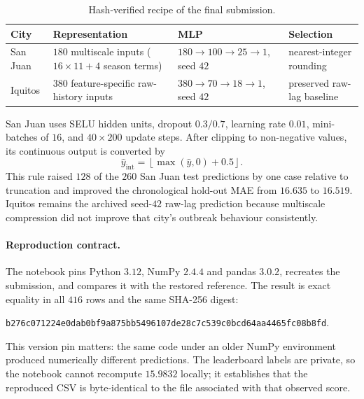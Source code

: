 \documentclass[11pt,a4paper]{article}
\newcommand{\submissionhash}{\texttt{b276c071224e0dab0bf9a875bb5496107}\allowbreak\texttt{de28c7c539c0bcd64aa4465fc08b8fd}}
\begin{document}
\begin{table}[H]
\centering
\caption{Hash-verified recipe of the final submission.}
\label{tab:finalrecipe}
\small
\begin{tabular}{>{\raggedright\arraybackslash}p{2.0cm}>{\raggedright\arraybackslash}p{4.2cm}>{\raggedright\arraybackslash}p{3.4cm}>{\raggedright\arraybackslash}p{3.0cm}}
\toprule
\textbf{City} & \textbf{Representation} & \textbf{MLP} & \textbf{Selection}\\
\midrule
San Juan & $180$ multiscale inputs ($16\times11+4$ season terms) & $180\rightarrow100\rightarrow25\rightarrow1$, seed $42$ & nearest-integer rounding\\
Iquitos & $380$ feature-specific raw-history inputs & $380\rightarrow70\rightarrow18\rightarrow1$, seed $42$ & preserved raw-lag baseline\\
\bottomrule
\end{tabular}
\end{table}

San Juan uses SELU hidden units, dropout $0.3/0.7$, learning rate $0.01$, mini-batches of $16$, and $40\times200$ update steps. After clipping to non-negative values, its continuous output is converted by
\begin{equation}
\hat y_{\mathrm{int}}=\left\lfloor\max(\hat y,0)+0.5\right\rfloor .
\end{equation}
This rule raised $128$ of the $260$ San Juan test predictions by one case relative to truncation and improved the chronological hold-out MAE from $16.635$ to $16.519$. Iquitos remains the archived seed-$42$ raw-lag prediction because multiscale compression did not improve that city's outbreak behaviour consistently.

\paragraph{Reproduction contract.} The notebook pins Python $3.12$, NumPy $2.4.4$ and pandas $3.0.2$, recreates the submission, and compares it with the restored reference. The result is exact equality in all $416$ rows and the same SHA-256 digest:
\begin{center}
\submissionhash.
\end{center}
This version pin matters: the same code under an older NumPy environment produced numerically different predictions. The leaderboard labels are private, so the notebook cannot recompute $15.9832$ locally; it establishes that the reproduced CSV is byte-identical to the file associated with that observed score.
\end{document}
